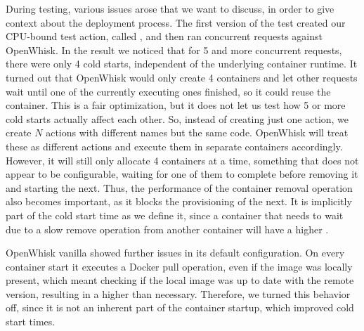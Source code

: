 During testing, various issues arose that we want to discuss, in order to give context about the deployment process. 
The first version of the test created our CPU-bound test action, called , and then ran concurrent requests against OpenWhisk. In the result we noticed that for 5 and more concurrent requests, there were only 4 cold starts, independent of the underlying container runtime. It turned out that OpenWhisk would only create 4 containers and let other requests wait until one of the currently executing ones finished, so it could reuse the container. This is a fair optimization, but it does not let us test how 5 or more cold starts actually affect each other. So, instead of creating just one action, we create $N$ actions with different names but the same code. OpenWhisk will treat these as different actions and execute them in separate containers accordingly. However, it will still only allocate 4 containers at a time, something that does not appear to be configurable, waiting for one of them to complete before removing it and starting the next. Thus, the performance of the container removal operation also becomes important, as it blocks the provisioning of the next. It is implicitly part of the cold start time as we define it, since a container that needs to wait due to a slow remove operation from another container will have a higher .

OpenWhisk vanilla showed further issues in its default configuration. On every container start it executes a Docker pull operation, even if the image was locally present, which meant checking if the local image was up to date with the remote version, resulting in a higher  than necessary. Therefore, we turned this behavior off, since it is not an inherent part of the container startup, which improved cold start times.

